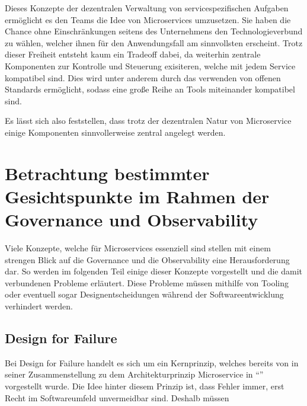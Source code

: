 Dieses Konzepte der dezentralen Verwaltung von servicespezifischen Aufgaben ermöglicht es den Teams die Idee von Microservices umzusetzen. Sie haben die Chance ohne Einschränkungen seitens des Unternehmens den Technologieverbund zu wählen, welcher ihnen für den Anwendungsfall am sinnvollsten erscheint. Trotz dieser Freiheit entsteht kaum ein Tradeoff dabei, da weiterhin zentrale Komponenten zur Kontrolle und Steuerung exisiteren, welche mit jedem Service kompatibel sind. Dies wird unter anderem durch das verwenden von offenen Standards ermöglicht, sodass eine große Reihe an Tools miteinander kompatibel sind.

Es lässt sich also feststellen, dass trotz der dezentralen Natur von Microservice einige Komponenten sinnvollerweise zentral angelegt werden.

\section{Betrachtung bestimmter Gesichtspunkte im Rahmen der Governance und Observability}

Viele Konzepte, welche für Microservices essenziell sind stellen mit einem strengen Blick auf die Governance und die Observability eine Herausforderung dar. So werden im folgenden Teil einige dieser Konzepte vorgestellt und die damit verbundenen Probleme erläutert. Diese Probleme müssen mithilfe von Tooling oder eventuell sogar Designentscheidungen während der Softwareentwicklung verhindert werden.

\subsection{Design for Failure}
Bei Design for Failure \autocite{FowlerMicrservices} handelt es sich um ein Kernprinzip, welches bereits von \citeauthor{FowlerMicrservices} in seiner Zusammenstellung zu dem Architekturprinzip Microservice in \enquote{} vorgestellt wurde. Die Idee hinter diesem Prinzip ist, dass Fehler immer, erst Recht im Softwareumfeld unvermeidbar sind. Deshalb müssen 


